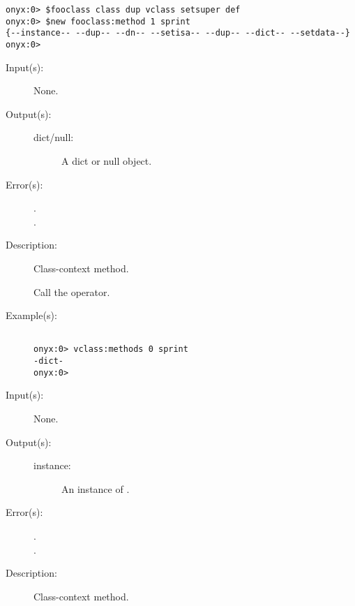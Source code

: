 \begin{description}
\begin{description}
\begin{verbatim}
onyx:0> $fooclass class dup vclass setsuper def
onyx:0> $new fooclass:method 1 sprint
{--instance-- --dup-- --dn-- --setisa-- --dup-- --dict-- --setdata--}
onyx:0>
		\end{verbatim}
	\end{description}
\label{vclass:methods}
\item[{\onyxop{--}{methods}{dict/null}}: ]
	\begin{description}\item[]
	\item[Input(s): ] None.
	\item[Output(s): ]
		\begin{description}\item[]
		\item[dict/null: ]
			A dict or null object.
		\end{description}
	\item[Error(s): ]
		\begin{description}\item[]
		\item[.]
		\item[.]
		\end{description}
	\item[Description: ]
		Class-context method.

		Call the 
		operator.
	\item[Example(s): ]\begin{verbatim}

onyx:0> vclass:methods 0 sprint
-dict-
onyx:0>
		\end{verbatim}
	\end{description}
\label{vclass:new}
\item[{\onyxop{--}{new}{instance}}: ]
	\begin{description}\item[]
	\item[Input(s): ] None.
	\item[Output(s): ]
		\begin{description}\item[]
		\item[instance: ]
			An instance of .
		\end{description}
	\item[Error(s): ]
		\begin{description}\item[]
		\item[.]
		\item[.]
		\end{description}
	\item[Description: ]
		Class-context method.


\end{description}
\end{description}
